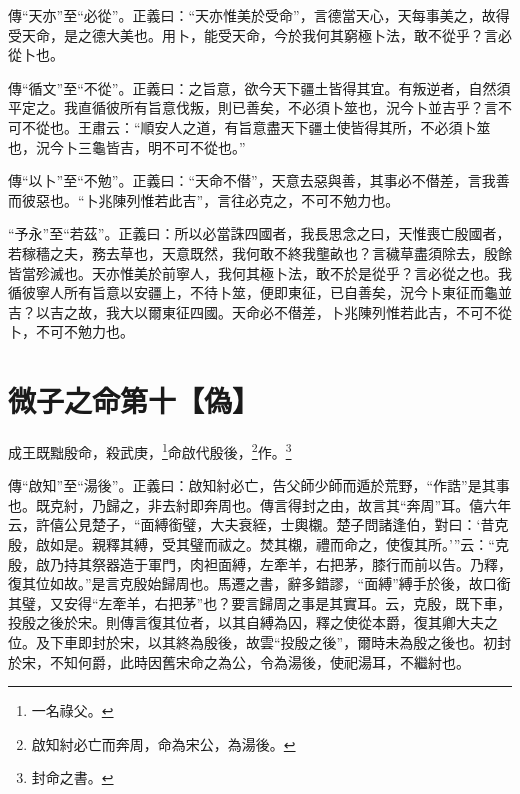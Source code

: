 {\noindent\zhuan{}\fzbyks 傳“天亦”至“必從”。正義曰：“天亦惟美於受命”，言德當天心，天每事美之，故得受天命，是之德大美也。用卜，能受天命，今於我何其窮極卜法，敢不從乎？言必從卜也。 \par}

{\noindent\zhuan{}\fzbyks 傳“循文”至“不從”。正義曰：之旨意，欲今天下疆土皆得其宜。有叛逆者，自然須平定之。我直循彼所有旨意伐叛，則已善矣，不必須卜筮也，況今卜並吉乎？言不可不從也。王肅云：“順安人之道，有旨意盡天下疆土使皆得其所，不必須卜筮也，況今卜三龜皆吉，明不可不從也。” \par}

{\noindent\zhuan{}\fzbyks 傳“以卜”至“不勉”。正義曰：“天命不僣”，天意去惡與善，其事必不僣差，言我善而彼惡也。“卜兆陳列惟若此吉”，言往必克之，不可不勉力也。 \par}

{\noindent\shu{}\fzkt “予永”至“若茲”。正義曰：所以必當誅四國者，我長思念之曰，天惟喪亡殷國者，若稼穡之夫，務去草也，天意既然，我何敢不終我壟畝也？言穢草盡須除去，殷餘皆當殄滅也。天亦惟美於前寧人，我何其極卜法，敢不於是從乎？言必從之也。我循彼寧人所有旨意以安疆上，不待卜筮，便即東征，已自善矣，況今卜東征而龜並吉？以吉之故，我大以爾東征四國。天命必不僣差，卜兆陳列惟若此吉，不可不從卜，不可不勉力也。 \par}

\section{微子之命第十【偽】}


成王既黜殷命，殺武庚，\footnote{一名祿父。}命啟代殷後，\footnote{啟知紂必亡而奔周，命為宋公，為湯後。}作。\footnote{封命之書。}


{\noindent\zhuan{}\fzbyks 傳“啟知”至“湯後”。正義曰：啟知紂必亡，告父師少師而遁於荒野，“作誥”是其事也。既克紂，乃歸之，非去紂即奔周也。傳言得封之由，故言其“奔周”耳。僖六年云，許僖公見楚子，“面縛銜璧，大夫衰絰，士輿櫬。楚子問諸逢伯，對曰：‘昔克殷，啟如是。親釋其縛，受其璧而祓之。焚其櫬，禮而命之，使復其所。’”云：“克殷，啟乃持其祭器造于軍門，肉袒面縛，左牽羊，右把茅，膝行而前以告。乃釋，復其位如故。”是言克殷始歸周也。馬遷之書，辭多錯謬，“面縛”縛手於後，故口銜其璧，又安得“左牽羊，右把茅”也？要言歸周之事是其實耳。云，克殷，既下車，投殷之後於宋。則傳言復其位者，以其自縛為囚，釋之使從本爵，復其卿大夫之位。及下車即封於宋，以其終為殷後，故雲“投殷之後”，爾時未為殷之後也。初封於宋，不知何爵，此時因舊宋命之為公，令為湯後，使祀湯耳，不繼紂也。 \par}

